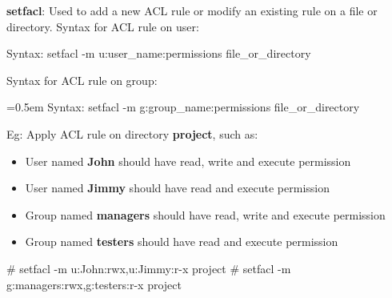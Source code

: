 \setlength{\columnsep}{3pt}
\begin{flushleft}
	\textbf{setfacl}: Used to add a new ACL rule or modify an existing rule on a file or directory.
	\newline
	Syntax for ACL rule on user:
	\begin{tcolorbox}[breakable,notitle,boxrule=-0pt,colback=pink,colframe=pink]
		\color{black}
		\font=9pt
		Syntax: setfacl -m u:user\_name:permissions file\_or\_directory
		\font=4pt
	\end{tcolorbox}
	
	Syntax for ACL rule on group:
	\begin{tcolorbox}[breakable,notitle,boxrule=-0pt,colback=pink,colframe=pink]
	\color{black}
	\font=0.5em
	Syntax: setfacl -m g:group\_name:permissions file\_or\_directory
	\font=4pt
	\end{tcolorbox}

	\item Eg: Apply ACL rule on directory \textbf{project}, such as:
	\begin{itemize}
		\item User named \textbf{John} should have read, write and execute permission
		\item User named \textbf{Jimmy} should have read and execute permission
		\item Group named \textbf{managers} should have read, write and execute permission
		\item Group named \textbf{testers} should have read and execute permission
	\end{itemize}
	\bigskip

	\begin{tcolorbox}[breakable,notitle,boxrule=-0pt,colback=black,colframe=black]
		\color{green}
		\font=9pt
		\# setfacl -m u:John:rwx,u:Jimmy:r-x project
		\newline
		\# setfacl -m g:managers:rwx,g:testers:r-x project
		\font=4pt
	\end{tcolorbox}
\newpage
	

\end{flushleft}
